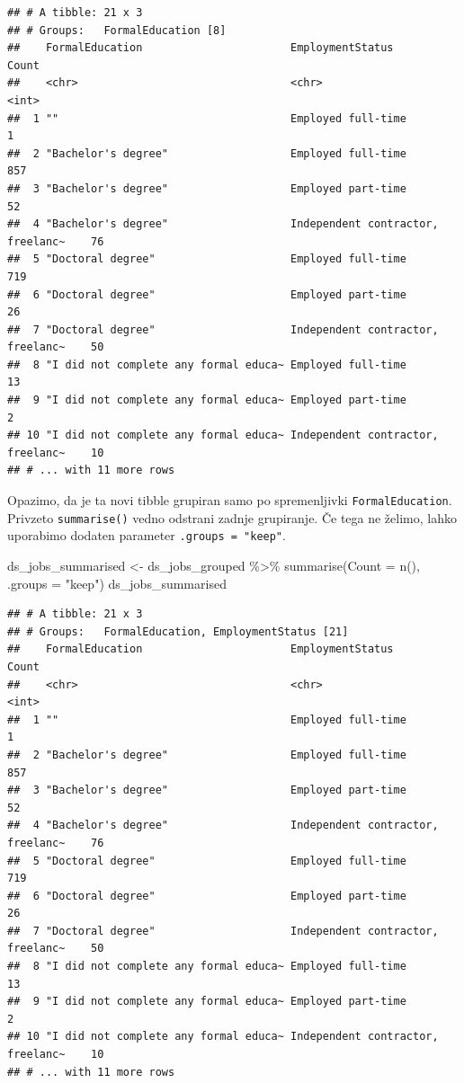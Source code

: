 \documentclass[
]{book}
\newenvironment{Shaded}{\begin{snugshade}}{\end{snugshade}}
\newcommand{\AttributeTok}[1]{\textcolor[rgb]{0.77,0.63,0.00}{#1}}
\newcommand{\FunctionTok}[1]{\textcolor[rgb]{0.00,0.00,0.00}{#1}}
\newcommand{\NormalTok}[1]{#1}
\newcommand{\OtherTok}[1]{\textcolor[rgb]{0.56,0.35,0.01}{#1}}
\newcommand{\SpecialCharTok}[1]{\textcolor[rgb]{0.00,0.00,0.00}{#1}}
\newcommand{\StringTok}[1]{\textcolor[rgb]{0.31,0.60,0.02}{#1}}
\begin{document}
\begin{verbatim}
## # A tibble: 21 x 3
## # Groups:   FormalEducation [8]
##    FormalEducation                       EmploymentStatus                  Count
##    <chr>                                 <chr>                             <int>
##  1 ""                                    Employed full-time                    1
##  2 "Bachelor's degree"                   Employed full-time                  857
##  3 "Bachelor's degree"                   Employed part-time                   52
##  4 "Bachelor's degree"                   Independent contractor, freelanc~    76
##  5 "Doctoral degree"                     Employed full-time                  719
##  6 "Doctoral degree"                     Employed part-time                   26
##  7 "Doctoral degree"                     Independent contractor, freelanc~    50
##  8 "I did not complete any formal educa~ Employed full-time                   13
##  9 "I did not complete any formal educa~ Employed part-time                    2
## 10 "I did not complete any formal educa~ Independent contractor, freelanc~    10
## # ... with 11 more rows
\end{verbatim}

Opazimo, da je ta novi tibble grupiran samo po spremenljivki \texttt{FormalEducation}. Privzeto \texttt{summarise()} vedno odstrani zadnje grupiranje. Če tega ne želimo, lahko uporabimo dodaten parameter \texttt{.groups\ =\ "keep"}.

\begin{Shaded}
\begin{Highlighting}[]
\NormalTok{ds\_jobs\_summarised }\OtherTok{\textless{}{-}}\NormalTok{ ds\_jobs\_grouped }\SpecialCharTok{\%\textgreater{}\%}
  \FunctionTok{summarise}\NormalTok{(}\AttributeTok{Count =} \FunctionTok{n}\NormalTok{(), }\AttributeTok{.groups =} \StringTok{"keep"}\NormalTok{)}
\NormalTok{ds\_jobs\_summarised}
\end{Highlighting}
\end{Shaded}

\begin{verbatim}
## # A tibble: 21 x 3
## # Groups:   FormalEducation, EmploymentStatus [21]
##    FormalEducation                       EmploymentStatus                  Count
##    <chr>                                 <chr>                             <int>
##  1 ""                                    Employed full-time                    1
##  2 "Bachelor's degree"                   Employed full-time                  857
##  3 "Bachelor's degree"                   Employed part-time                   52
##  4 "Bachelor's degree"                   Independent contractor, freelanc~    76
##  5 "Doctoral degree"                     Employed full-time                  719
##  6 "Doctoral degree"                     Employed part-time                   26
##  7 "Doctoral degree"                     Independent contractor, freelanc~    50
##  8 "I did not complete any formal educa~ Employed full-time                   13
##  9 "I did not complete any formal educa~ Employed part-time                    2
## 10 "I did not complete any formal educa~ Independent contractor, freelanc~    10
## # ... with 11 more rows
\end{verbatim}
\end{document}
